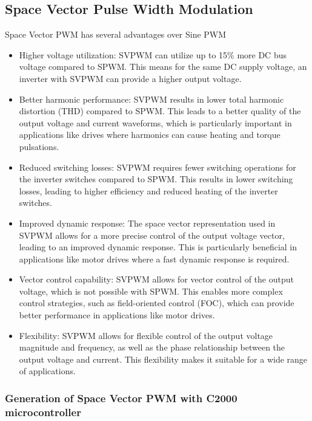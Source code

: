 \subsection{Space Vector Pulse Width Modulation}

Space Vector PWM has several advantages over Sine PWM

\begin{itemize}
	\item Higher voltage utilization: SVPWM can utilize up to 15\% more DC bus voltage compared to SPWM. This means for the same DC supply voltage, an inverter with SVPWM can provide a higher output voltage.

	\item Better harmonic performance: SVPWM results in lower total harmonic distortion (THD) compared to SPWM. This leads to a better quality of the output voltage and current waveforms, which is particularly important in applications like drives where harmonics can cause heating and torque pulsations.

	\item Reduced switching losses: SVPWM requires fewer switching operations for the inverter switches compared to SPWM. This results in lower switching losses, leading to higher efficiency and reduced heating of the inverter switches.

	\item Improved dynamic response: The space vector representation used in SVPWM allows for a more precise control of the output voltage vector, leading to an improved dynamic response. This is particularly beneficial in applications like motor drives where a fast dynamic response is required.

	\item Vector control capability: SVPWM allows for vector control of the output voltage, which is not possible with SPWM. This enables more complex control strategies, such as field-oriented control (FOC), which can provide better performance in applications like motor drives.

	\item Flexibility: SVPWM allows for flexible control of the output voltage magnitude and frequency, as well as the phase relationship between the output voltage and current. This flexibility makes it suitable for a wide range of applications.
\end{itemize}

\subsubsection{Generation of Space Vector PWM with C2000 microcontroller}

